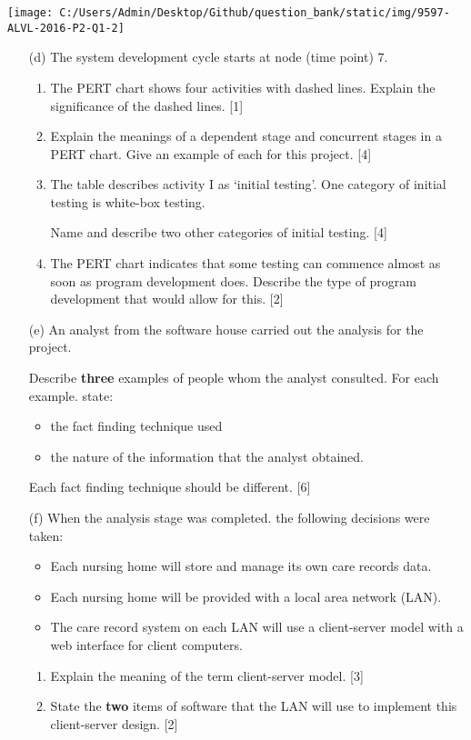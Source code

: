 \begin{center}
\texttt{[image: C:/Users/Admin/Desktop/Github/question\_bank/static/img/9597-ALVL-2016-P2-Q1-2]}
\par\end{center}
\begin{enumerate}
\item[(d)] The system development cycle starts at node (time point) 7.
\begin{enumerate}
\item The PERT chart shows four activities with dashed lines. Explain the
significance of the dashed lines.\hfill{} {[}1{]}
\item Explain the meanings of a dependent stage and concurrent stages in
a PERT chart. Give an example of each for this project. \hfill{}{[}4{]}
\item The table describes activity I as \textquoteleft initial testing'.
One category of initial testing is white-box testing.

Name and describe two other categories of initial testing. \hfill{}{[}4{]}
\item The PERT chart indicates that some testing can commence almost as
soon as program development does. Describe the type of program development
that would allow for this.\hfill{} {[}2{]}
\end{enumerate}
\item[(e)] An analyst from the software house carried out the analysis for the
project. 

Describe \textbf{three} examples of people whom the analyst consulted.
For each example. state: 
\begin{itemize}
\item the fact finding technique used 
\item the nature of the information that the analyst obtained. 
\end{itemize}
Each fact finding technique should be different.\hfill{} {[}6{]}
\item[(f)]  When the analysis stage was completed. the following decisions were
taken: 
\begin{itemize}
\item Each nursing home will store and manage its own care records data. 
\item Each nursing home will be provided with a local area network (LAN). 
\item The care record system on each LAN will use a client-server model
with a web interface for client computers. 
\end{itemize}
\begin{enumerate}
\item Explain the meaning of the term client-server model. \hfill{}{[}3{]}
\item State the \textbf{two} items of software that the LAN will use to
implement this client-server design. \hfill{}{[}2{]}
\end{enumerate}
\end{enumerate}
